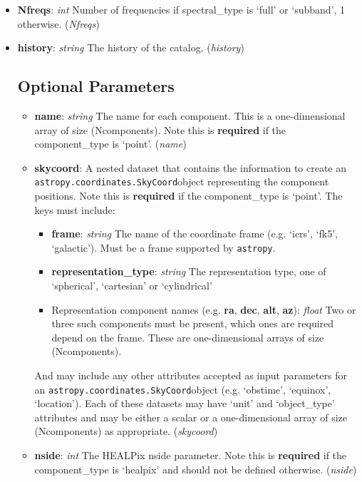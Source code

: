 \documentclass[11pt, oneside]{article}
\begin{document}
\begin{itemize}
\item \textbf{Nfreqs}: \textit{int}
Number of frequencies if spectral_type is `full' or `subband', 1 otherwise. (\textit{Nfreqs})

\item \textbf{history}: \textit{string} The history of the catalog. (\textit{history})



\subsection{Optional Parameters}
\label{sec:opt_params}
\begin{itemize}
\item \textbf{name}: \textit{string} The name for each component. This is a one-dimensional array of size (Ncomponents).
Note this is \textbf{required} if the component\_type is `point'. (\textit{name})

\item \textbf{skycoord}:
A nested dataset that contains the information to create an \verb+astropy.coordinates.SkyCoord+object representing the component positions.
Note this is \textbf{required} if the component\_type is `point'. The keys must include:
	\begin{itemize}
	\item \textbf{frame}: \textit{string} The name of the coordinate frame (e.g. `icrs', `fk5', `galactic'). Must be a frame supported by \verb+astropy+.
	\item \textbf{representation\_type}: \textit{string} The representation type, one of `spherical', `cartesian' or `cylindrical'
	\item Representation component names (e.g. \textbf{ra}, \textbf{dec}, \textbf{alt}, \textbf{az}): \textit{float} Two or three such components must be present, 	which ones are required depend on the frame. These are one-dimensional arrays of size (Ncomponents).
	\end{itemize}
And may include any other attributes accepted as input parameters for an \verb+astropy.coordinates.SkyCoord+object (e.g. `obstime', `equinox', `location').
Each of these datasets may have `unit' and `object\_type' attributes and may be either a scalar or a one-dimensional array of size (Ncomponents) as appropriate.
(\textit{skycoord})

\item \textbf{nside}: \textit{int}
The HEALPix nside parameter. Note this is \textbf{required} if the component\_type is `healpix' and should not be defined otherwise. (\textit{nside})


\end{itemize}
\end{itemize}
\end{document}
